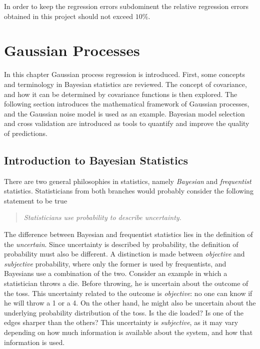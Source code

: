 \documentclass[twoside,english]{uiofysmaster}
\makeatletter
\newenvironment{chapquote}[2][2em]
  {\setlength{\@tempdima}{#1}%
   \def\chapquote@author{#2}%
   \parshape 1 \@tempdima \dimexpr\textwidth-2\@tempdima\relax%
   \itshape}
  {\par\normalfont\hfill--\ \chapquote@author\hspace*{\@tempdima}\par\bigskip}
\makeatother
\begin{document}
{In order to keep the regression errors subdominent the relative regression errors obtained in this project should not exceed $10 \%$.







\chapter{Gaussian Processes}\label{Chapter:Gaussian Processes}



In this chapter Gaussian process regression is introduced. First, some concepts and terminology in Bayesian statistics are reviewed. The concept of covariance, and how it can be determined by covariance functions is then explored. The following section introduces the mathematical framework of Gaussian processes, and the Gaussian noise model is used as an example. Bayesian model selection and cross validation are introduced as tools to quantify and improve the quality of predictions.

\section{Introduction to Bayesian Statistics}

There are two general philosophies in statistics, namely \textit{Bayesian} and \textit{frequentist} statistics. Statisticians from both branches would probably consider the following statement to be true
\begin{quote}
\textit{Statisticians use probability to describe uncertainty.}
\end{quote}
The difference between Bayesian and frequentist statistics lies in the definition of the \textit{uncertain}. Since uncertainty is described by probability, the definition of probability must also be different. A distinction is made between \textit{objective} and \textit{subjective} probability, where only the former is used by frequentists, and Bayesians use a combination of the two. Consider an example in which a statistician throws a die. Before throwing, he is uncertain about the outcome of the toss. This uncertainty related to the outcome is \textit{objective}: no one can know if he will throw a 1 or a 4. On the other hand, he might also be uncertain about the underlying probability distribution of the toss. Is the die loaded? Is one of the edges sharper than the others? This uncertainty is \textit{subjective}, as it may vary depending on how much information is available about the system, and how that information is used. 

}
\end{document}
